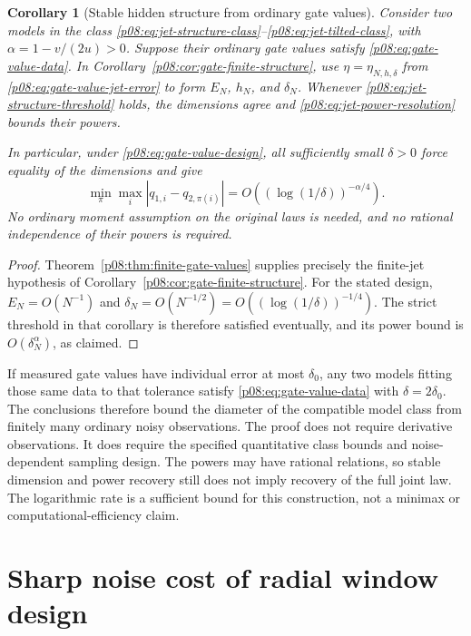 \documentclass[11pt,letterpaper]{article}
\newtheorem{corollary}[theorem]{Corollary}
\theoremstyle{definition}
\theoremstyle{remark}
\newcommand{\1}{\mathbf 1}
\begin{document}
\begin{corollary}[Stable hidden structure from ordinary gate values]
\label{p08:cor:gate-values-finite-structure}
Consider two models in the class
\eqref{p08:eq:jet-structure-class}--\eqref{p08:eq:jet-tilted-class}, with
$\alpha=1-v/(2u)>0$.  Suppose their ordinary gate values satisfy
\eqref{p08:eq:gate-value-data}.  In
Corollary~\ref{p08:cor:gate-finite-structure}, use
$\eta=\eta_{N,h,\delta}$ from \eqref{p08:eq:gate-value-jet-error} to form
$E_N$, $h_N$, and $\delta_N$.  Whenever
\eqref{p08:eq:jet-structure-threshold} holds, the dimensions agree and
\eqref{p08:eq:jet-power-resolution} bounds their powers.

In particular, under \eqref{p08:eq:gate-value-design}, all sufficiently small
$\delta>0$ force equality of the dimensions and give
\begin{equation}\label{p08:eq:gate-value-power-rate}
 \min_\pi\max_i|q_{1,i}-q_{2,\pi(i)}|
 =O\left((\log(1/\delta))^{-\alpha/4}\right).
\end{equation}
No ordinary moment assumption on the original laws is needed, and no
rational independence of their powers is required.
\end{corollary}

\begin{proof}
Theorem~\ref{p08:thm:finite-gate-values} supplies precisely the finite-jet
hypothesis of Corollary~\ref{p08:cor:gate-finite-structure}.
For the stated design, $E_N=O(N^{-1})$ and
$\delta_N=O(N^{-1/2})=O((\log(1/\delta))^{-1/4})$.
The strict threshold in that corollary is therefore satisfied eventually,
and its power bound is $O(\delta_N^\alpha)$, as claimed.
\end{proof}

If measured gate values have individual error at most $\delta_0$, any two
models fitting those same data to that tolerance satisfy
\eqref{p08:eq:gate-value-data} with $\delta=2\delta_0$.  The conclusions
therefore bound the diameter of the compatible model class from finitely
many ordinary noisy observations.  The proof does not require derivative
observations.  It does require the specified quantitative class bounds and
noise-dependent sampling design.  The powers may have rational relations,
so stable dimension and power recovery still does not imply recovery of
the full joint law.  The logarithmic rate is a sufficient bound for this
construction, not a minimax or computational-efficiency claim.

\section{Sharp noise cost of radial window design}
\label{p07:sec:window-noise}
\end{document}
